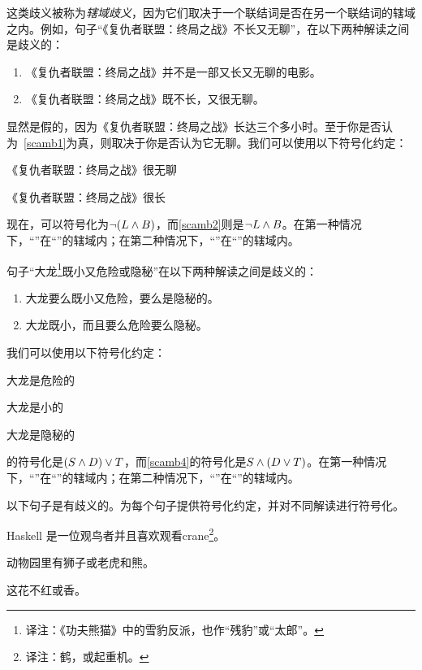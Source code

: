 这类歧义被称为\emph{辖域歧义}，因为它们取决于一个联结词是否在另一个联结词的辖域之内。例如，句子“《复仇者联盟：终局之战》不长又无聊”，在以下两种解读之间是歧义的：
\begin{enumerate}
	\item\label{scamb1} 《复仇者联盟：终局之战》并不是一部又长又无聊的电影。
	\item\label{scamb2} 《复仇者联盟：终局之战》既不长，又很无聊。
\end{enumerate}

显然是假的，因为《复仇者联盟：终局之战》长达三个多小时。至于你是否认为~\cref*{scamb1}为真，则取决于你是否认为它无聊。我们可以使用以下符号化约定：
\begin{ekey}
	\item[B] 《复仇者联盟：终局之战》很无聊
	\item[L] 《复仇者联盟：终局之战》很长
\end{ekey}

现在，可以符号化为$\neg(L \wedge B)$，而\cref*{scamb2}则是$\neg L \wedge B$。在第一种情况下，“\eand”在“\enot”的辖域内；在第二种情况下，“\enot”在“\eand”的辖域内。

句子“大龙\footnote{译注：《功夫熊猫》中的雪豹反派，也作“残豹”或“太郎”。}既小又危险或隐秘”在以下两种解读之间是歧义的：
\begin{enumerate}
	\item\label{scamb3} 大龙要么既小又危险，要么是隐秘的。
	\item\label{scamb4} 大龙既小，而且要么危险要么隐秘。
\end{enumerate}

我们可以使用以下符号化约定：
\begin{ekey}
	\item[D] 大龙是危险的
	\item[S] 大龙是小的
	\item[T] 大龙是隐秘的
\end{ekey}

的符号化是$(S \wedge D) \vee T$，而\cref*{scamb4}的符号化是$S \wedge (D \vee T)$。在第一种情况下，“\eand”在“\eor”的辖域内；在第二种情况下，“\eor”在“\eand”的辖域内。

\practiceproblems
\solutions
\problempart 以下句子是有歧义的。为每个句子提供符号化约定，并对不同解读进行符号化。
\begin{compactlist}
	\item Haskell 是一位观鸟者并且喜欢观看crane\footnote{译注：鹤，或起重机。}。
	\item 动物园里有狮子或老虎和熊。
	\item 这花不红或香。
\end{compactlist}

